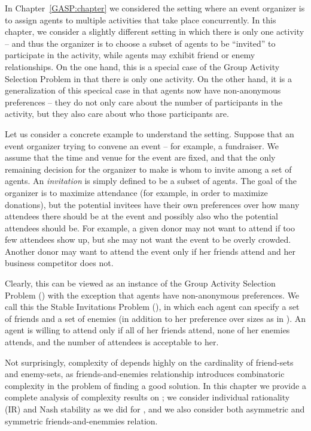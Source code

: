 \label{SIP:chapter}

In Chapter~\ref{GASP:chapter} we considered the setting where an event organizer is to assign agents to multiple activities that take place concurrently. In this chapter, we consider a slightly different setting in which there is only one activity -- and thus the organizer is to choose a subset of agents to be ``invited'' to participate in the activity, while agents may exhibit friend or enemy relationships. 
On the one hand, this is a special case of the Group Activity Selection Problem in that there is only one activity. On the other hand, it is a generalization of this specical case in that agents now have non-anonymous preferences -- they do not only care about the number of participants in the activity, but they also care about who those participants are.

Let us consider a concrete example to understand the setting. Suppose that  an event organizer trying to convene an event -- for example, a fundraiser. We assume that the time and venue for the event are fixed,
and that the only remaining decision for the organizer to make is whom
to invite among a set of agents.
An \emph{invitation} is simply defined to be a subset of agents.
The goal of the organizer is to maximize attendance (for example, 
in order to maximize donations), but the potential invitees have 
their own preferences over how many attendees there should be at the event 
and possibly also who the potential attendees should be.
For example, a given donor may not want to attend if too few attendees 
show up, but she may not want the event to be overly crowded. 
Another donor may want to attend the event only
if her friends attend and her business competitor does not.

Clearly, this can be viewed as an instance of the Group Activity Selection Problem (\GASP) with the exception that agents have non-anonymous preferences. 
We call this the Stable Invitations Problem (\SIP), in which each agent 
can specify a set of friends and a set of enemies (in addition to her preference over sizes as in \GASP).
An agent is willing to attend only if all of her friends attend, none of her enemies attends, and  the number of attendees is acceptable to her. 

Not surprisingly, complexity of \SIPs depends highly on the cardinality of friend-sets and enemy-sets, as friends-and-enemies relationship introduces combinatoric complexity in the problem of finding a good solution. 
In this chapter we provide a complete analysis of complexity results on \SIP; we consider individual rationality (IR) and Nash stability as we did for \GASP, and we also consider both asymmetric and symmetric friends-and-enemmies relation. 

